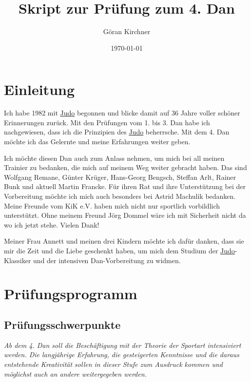 \documentclass[justified, a4paper, notitlepage, captions=tableheading, nobib]{tufte-handout}
\author{Göran Kirchner}
\date{\today}
\title{Skript zur Prüfung zum 4. Dan}
\begin{document}
\maketitle
\tableofcontents

\ifxetex
  \newcommand{\textls}[2][5]{%
    \begingroup\addfontfeatures{LetterSpace=#1}#2\endgroup
  }
  \renewcommand{\allcapsspacing}[1]{\textls[15]{#1}}
  \renewcommand{\smallcapsspacing}[1]{\textls[10]{#1}}
  \renewcommand{\allcaps}[1]{\textls[15]{\MakeTextUppercase{#1}}}
  \renewcommand{\smallcaps}[1]{\smallcapsspacing{\scshape\MakeTextLowercase{#1}}}
  \renewcommand{\textsc}[1]{\smallcapsspacing{\textsmallcaps{#1}}}
\fi

\newpage
\section{Einleitung}
\label{sec:org91bff7a}
Ich habe 1982 mit \hyperref[org79c792e]{Judo} begonnen und blicke damit auf 36 Jahre voller schöner Erinnerungen zurück. 
Mit den Prüfungen vom 1. bis 3. Dan habe ich nachgewiesen, dass ich die Prinzipien des \hyperref[org79c792e]{Judo} beherrsche. Mit dem 4. Dan möchte ich das Gelernte und meine Erfahrungen weiter geben.

Ich möchte diesen Dan auch zum Anlass nehmen, um mich bei all meinen Trainier zu bedanken, die mich auf meinem Weg weiter gebracht haben. Das sind Wolfgang Remane, Günter Krüger, Hans-Georg Bengsch, Steffan Arlt, Rainer Bunk und aktuell Martin Francke. Für ihren Rat und ihre Unterstützung bei der Vorbereitung möchte ich mich auch besonders bei Astrid Machulik bedanken. Meine Freunde vom KiK e.V. haben mich nicht nur sportlich vorbildlich unterstützt. Ohne meinem Freund Jörg Dommel wäre ich mit Sicherheit nicht da wo ich jetzt stehe. Vielen Dank!

Meiner Frau Annett und meinen drei Kindern möchte ich dafür danken, dass sie mir die Zeit und die Liebe geschenkt haben, um mich dem Studium der \hyperref[org79c792e]{Judo}-Klassiker und der intensiven Dan-Vorbereitung zu widmen.

\newpage
\section{Prüfungsprogramm}
\label{sec:org5d15ec5}
\subsection{Prüfungsschwerpunkte}
\label{sec:org6bf54a2}
\emph{Ab dem 4. Dan soll die Beschäftigung mit der Theorie der Sportart intensiviert werden.
Die langjährige Erfahrung, die gesteigerten Kenntnisse und die daraus entstehende Kreativität sollen in dieser Stufe zum Ausdruck kommen und möglichst auch an andere weitergegeben werden.}
\end{document}
